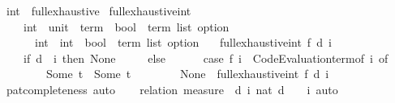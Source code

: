 \begin{isabellebody}
\isanewline
{}\isamarkupfalse%
\ int\ {\isacharcolon}{\kern0pt}{\isacharcolon}{\kern0pt}\ full{\isacharunderscore}{\kern0pt}exhaustive\isanewline
{}\isanewline
\isanewline
{}\isamarkupfalse%
\ full{\isacharunderscore}{\kern0pt}exhaustive{\isacharunderscore}{\kern0pt}int{\isacharprime}{\kern0pt}\ {\isacharcolon}{\kern0pt}{\isacharcolon}{\kern0pt}\isanewline
\ \ \ \ {\isachardoublequoteopen}{\isacharparenleft}{\kern0pt}int\ {\isasymtimes}\ {\isacharparenleft}{\kern0pt}unit\ {\isasymRightarrow}\ term{\isacharparenright}{\kern0pt}\ {\isasymRightarrow}\ {\isacharparenleft}{\kern0pt}bool\ {\isasymtimes}\ term\ list{\isacharparenright}{\kern0pt}\ option{\isacharparenright}{\kern0pt}\ {\isasymRightarrow}\isanewline
\ \ \ \ \ \ int\ {\isasymRightarrow}\ int\ {\isasymRightarrow}\ {\isacharparenleft}{\kern0pt}bool\ {\isasymtimes}\ term\ list{\isacharparenright}{\kern0pt}\ option{\isachardoublequoteclose}\isanewline
\ \ \ {\isachardoublequoteopen}full{\isacharunderscore}{\kern0pt}exhaustive{\isacharunderscore}{\kern0pt}int{\isacharprime}{\kern0pt}\ f\ d\ i\ {\isacharequal}{\kern0pt}\isanewline
\ \ \ \ {\isacharparenleft}{\kern0pt}if\ d\ {\isacharless}{\kern0pt}\ i\ then\ None\isanewline
\ \ \ \ \ else\isanewline
\ \ \ \ \ \ {\isacharparenleft}{\kern0pt}case\ f\ {\isacharparenleft}{\kern0pt}i{\isacharcomma}{\kern0pt}\ {\isasymlambda}{\isacharunderscore}{\kern0pt}{\isachardot}{\kern0pt}\ Code{\isacharunderscore}{\kern0pt}Evaluation{\isachardot}{\kern0pt}term{\isacharunderscore}{\kern0pt}of\ i{\isacharparenright}{\kern0pt}\ of\isanewline
\ \ \ \ \ \ \ \ Some\ t\ {\isasymRightarrow}\ Some\ t\isanewline
\ \ \ \ \ \ \ {\isacharbar}{\kern0pt}\ None\ {\isasymRightarrow}\ full{\isacharunderscore}{\kern0pt}exhaustive{\isacharunderscore}{\kern0pt}int{\isacharprime}{\kern0pt}\ f\ d\ {\isacharparenleft}{\kern0pt}i\ {\isacharplus}{\kern0pt}\ {}{\isacharparenright}{\kern0pt}{\isacharparenright}{\kern0pt}{\isacharparenright}{\kern0pt}{\isachardoublequoteclose}\isanewline
%
\isadelimproof
%
\endisadelimproof
%
\isatagproof
{}\isamarkupfalse%
\ pat{\isacharunderscore}{\kern0pt}completeness\ auto%
\endisatagproof
{\isafoldproof}%
%
\isadelimproof
\isanewline
%
\endisadelimproof
\isanewline
{}\isamarkupfalse%
\isanewline
%
\isadelimproof
\ \ %
\endisadelimproof
%
\isatagproof
{}\isamarkupfalse%
\ {\isacharparenleft}{\kern0pt}relation\ {\isachardoublequoteopen}measure\ {\isacharparenleft}{\kern0pt}{\isasymlambda}{\isacharparenleft}{\kern0pt}{\isacharunderscore}{\kern0pt}{\isacharcomma}{\kern0pt}\ d{\isacharcomma}{\kern0pt}\ i{\isacharparenright}{\kern0pt}{\isachardot}{\kern0pt}\ nat\ {\isacharparenleft}{\kern0pt}d\ {\isacharplus}{\kern0pt}\ {}\ {\isacharminus}{\kern0pt}\ i{\isacharparenright}{\kern0pt}{\isacharparenright}{\kern0pt}{\isachardoublequoteclose}{\isacharparenright}{\kern0pt}\ auto%

\end{isabellebody}
